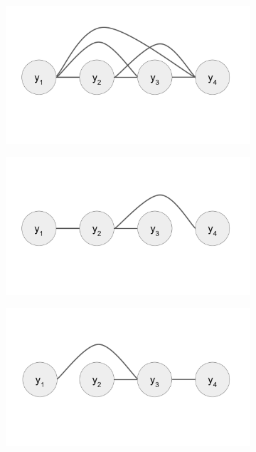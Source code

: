\begin{figure}
\begin{subfigure}[t]{.3\textwidth}
\includegraphics[width=\linewidth]{./complete_graph.pdf}
\label{fig:fig_complete}
\end{subfigure}
\begin{subfigure}[t]{.3\textwidth}
\includegraphics[width=\linewidth]{./y2_graph.pdf}
\label{fig:fig_y2}
\end{subfigure}
\begin{subfigure}[t]{.3\textwidth}
\includegraphics[width=\linewidth]{./y3_graph.pdf}

\end{subfigure}
\end{figure}
